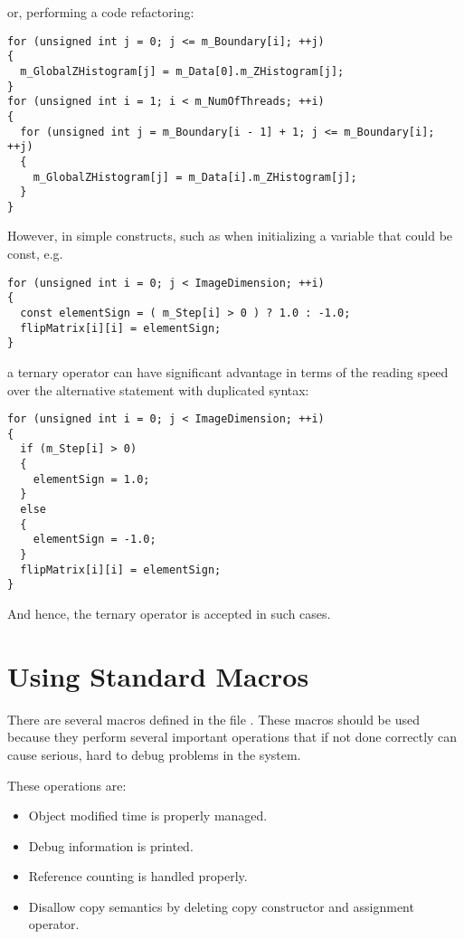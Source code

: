 or, performing a code refactoring:

\small
\begin{verbatim}
for (unsigned int j = 0; j <= m_Boundary[i]; ++j)
{
  m_GlobalZHistogram[j] = m_Data[0].m_ZHistogram[j];
}
for (unsigned int i = 1; i < m_NumOfThreads; ++i)
{
  for (unsigned int j = m_Boundary[i - 1] + 1; j <= m_Boundary[i]; ++j)
  {
    m_GlobalZHistogram[j] = m_Data[i].m_ZHistogram[j];
  }
}
\end{verbatim}
\normalsize

However, in simple constructs, such as when initializing a variable that could
be const, e.g.

\small
\begin{verbatim}
for (unsigned int i = 0; j < ImageDimension; ++i)
{
  const elementSign = ( m_Step[i] > 0 ) ? 1.0 : -1.0;
  flipMatrix[i][i] = elementSign;
}
\end{verbatim}
\normalsize

a ternary operator can have significant advantage in terms of the reading speed
over the alternative  statement with duplicated syntax:

\small
\begin{verbatim}
for (unsigned int i = 0; j < ImageDimension; ++i)
{
  if (m_Step[i] > 0)
  {
    elementSign = 1.0;
  }
  else
  {
    elementSign = -1.0;
  }
  flipMatrix[i][i] = elementSign;
}
\end{verbatim}
\normalsize

And hence, the ternary operator is accepted in such cases.


\section{Using Standard Macros}
\label{sec:UsingStandardMacros}

There are several macros defined in the file . These macros
should be used because they perform several important operations that if not
done correctly can cause serious, hard to debug problems in the system.

These operations are:
\begin{itemize}
\item Object modified time is properly managed.
\item Debug information is printed.
\item Reference counting is handled properly.
\item Disallow copy semantics by deleting copy constructor and assignment
operator.
\end{itemize}

